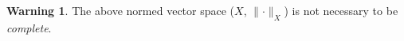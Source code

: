 \documentclass[12pt]{article}
\numberwithin{equation}{section}
\theoremstyle{plain} %
\theoremstyle{definition}
\newtheorem{warning}[equation]{Warning}
\theoremstyle{remark}
\begin{document}
\begin{warning}
The above normed vector space ($X$, $\lVert \cdot \rVert_{X}$) is not necessary to be \textit{complete}. 
\end{warning}


%  	
%
%

%

\end{document}
